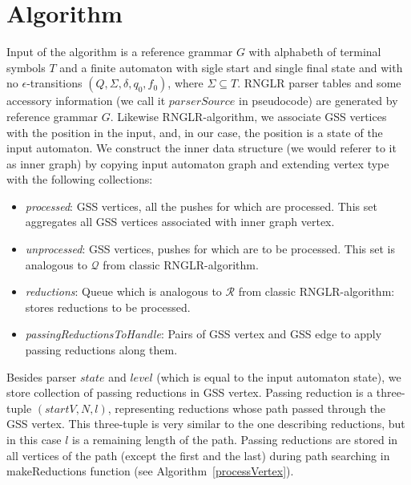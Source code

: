 \section{Algorithm}
Input of the algorithm is a reference grammar $G$ with alphabeth of terminal symbols $T$ 
and a finite automaton with sigle start and single final state and with no $\epsilon$-transitions $(Q, \Sigma, \delta, q_0, f_0)$, where 
$\Sigma \subseteq T$. RNGLR parser tables and some accessory information (we call it $parserSource$ 
in pseudocode) are generated by reference grammar $G$. 
Likewise RNGLR-algorithm, we associate GSS vertices with the position in the input,
and, in our case, the position is a state of the input automaton. We construct the inner 
data structure (we would referer to it as inner graph) by copying input automaton graph and extending vertex type with 
the following collections: 
\begin{itemize}
  \item \emph{processed}: GSS vertices, all the pushes for which are processed. 
                             This set aggregates all GSS vertices associated with inner graph vertex.
  \item \emph{unprocessed}: GSS vertices, pushes for which are to be processed. 
                               This set is analogous to $\mathcal{Q}$ from classic RNGLR-algorithm.
  \item \emph{reductions}: Queue which is analogous to $\mathcal{R}$ from classic RNGLR-algorithm: 
                              stores reductions to be processed.
  \item \emph{passingReductionsToHandle}: Pairs of GSS vertex and GSS edge to apply passing reductions along them.
\end{itemize}
Besides parser $state$ and $level$ (which is equal to the input automaton state), 
we store collection of passing reductions in GSS vertex. Passing reduction is a 
three-tuple $(startV, N, l)$, representing reductions whose path passed through 
the GSS vertex. This three-tuple is very similar to the one describing reductions, 
but in this case $l$ is a remaining length of the path. Passing reductions are 
stored in all vertices of the path (except the first and the last) during path 
searching in makeReductions function (see Algorithm~\ref{processVertex}).

